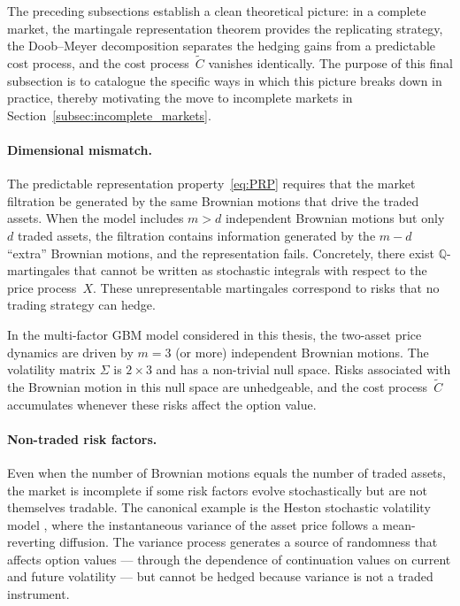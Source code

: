 The preceding subsections establish a clean theoretical picture: in a
complete market, the martingale representation theorem provides the
replicating strategy, the Doob--Meyer decomposition separates the hedging
gains from a predictable cost process, and the cost process~$\tilde{C}$
vanishes identically.  The purpose of this final subsection is to
catalogue the specific ways in which this picture breaks down in
practice, thereby motivating the move to incomplete markets in
Section~\ref{subsec:incomplete_markets}.

\paragraph{Dimensional mismatch.}
The predictable representation property~\eqref{eq:PRP} requires that
the market filtration be generated by the same Brownian motions that
drive the traded assets.  When the model includes $m > d$ independent
Brownian motions but only $d$ traded assets, the filtration contains
information generated by the $m - d$ ``extra'' Brownian motions, and
the representation fails.  Concretely, there exist
$\mathbb{Q}$-martingales that cannot be written as stochastic integrals
with respect to the price process~$X$.  These unrepresentable martingales
correspond to risks that no trading strategy can hedge.

In the multi-factor GBM model considered in this thesis, the two-asset
price dynamics are driven by $m = 3$ (or more) independent Brownian
motions.  The volatility matrix $\Sigma$ is $2 \times 3$ and has a
non-trivial null space.  Risks associated with the Brownian motion in this
null space are unhedgeable, and the cost process~$\tilde{C}$ accumulates
whenever these risks affect the option value.

\paragraph{Non-traded risk factors.}
Even when the number of Brownian motions equals the number of traded
assets, the market is incomplete if some risk factors evolve
stochastically but are not themselves tradable.  The canonical example is
the Heston stochastic volatility model \citep{Heston1993}, where the
instantaneous variance of the asset price follows a mean-reverting
diffusion.  The variance process generates a source of randomness that
affects option values --- through the dependence of continuation values on
current and future volatility --- but cannot be hedged because variance is
not a traded instrument.

